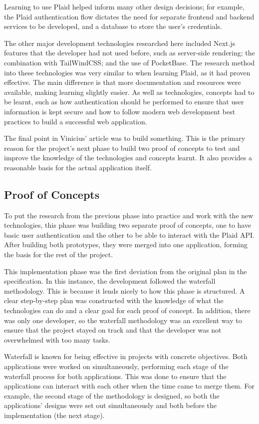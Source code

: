 Learning to use Plaid helped inform many other design decisions; for example, the Plaid authentication flow dictates the need for separate frontend and backend services to be developed, and a database to store the user's credentials.

The other major development technologies researched here included Next.js features that the developer had not used before, such as server-side rendering; the combination with TailWindCSS; and the use of PocketBase. The research method into these technologies was very similar to when learning Plaid, as it had proven effective. The main difference is that more documentation and resources were available, making learning slightly easier. As well as technologies, concepts had to be learnt, such as how authentication should be performed to ensure that user information is kept secure and how to follow modern web development best practices to build a successful web application.

The final point in Vinicius' article was to build something. This is the primary reason for the project's next phase to build two proof of concepts to test and improve the knowledge of the technologies and concepts learnt. It also provides a reasonable basis for the actual application itself.

\subsection{Proof of Concepts}
To put the research from the previous phase into practice and work with the new technologies, this phase was building two separate proof of concepts, one to have basic user authentication and the other to be able to interact with the Plaid API. After building both prototypes, they were merged into one application, forming the basis for the rest of the project.

This implementation phase was the first deviation from the original plan in the specification. In this instance, the development followed the waterfall methodology. This is because it lends nicely to how this phase is structured. A clear step-by-step plan was constructed with the knowledge of what the technologies can do and a clear goal for each proof of concept. In addition, there was only one developer, so the waterfall methodology was an excellent way to ensure that the project stayed on track and that the developer was not overwhelmed with too many tasks.

Waterfall is known for being effective in projects with concrete objectives. Both applications were worked on simultaneously, performing each stage of the waterfall process for both applications. This was done to ensure that the applications can interact with each other when the time came to merge them. For example, the second stage of the methodology is designed, so both the applications' designs were set out simultaneously and both before the implementation (the next stage).

